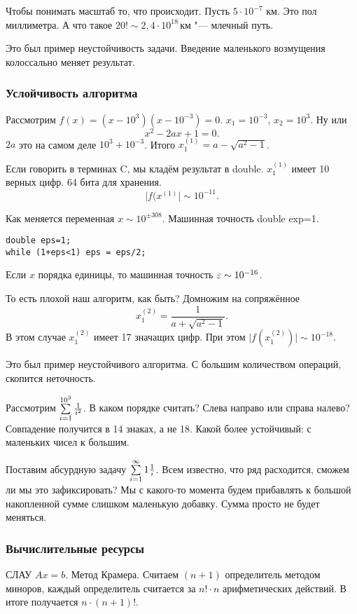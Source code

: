 Чтобы понимать масштаб то, что происходит. Пусть $5\cdot10^{-7}$ км. Это пол миллиметра. А что такое $20!\sim 2{,}4\cdot 10^{18}\,$км "--- млечный путь.

Это был пример неустойчивость задачи. Введение маленького возмущения колоссально меняет результат.

\subsubsection{Услойчивость алгоритма}
 Рассмотрим $f(x) = (x-10^3)(x-10^{-3})=0$. $x_1 = 10^{-3}$, $x_2 = 10^{3}$. Ну или
\[
  x^2 - 2a x + 1 = 0.
\]
$2a$ это на самом деле $10^3 + 10^{-3}$.
Итого $x_1^{(1)} = a - \sqrt{a^2 - 1}$.

Если говорить в терминах C, мы кладём результат в double. $x_1^{(1)}$ имеет 10 верных цифр. 64 бита для хранения.
\[
  \big|f(x^{(1)}\big|\sim 10^{-11}.
\]

Как меняется переменная $x\sim 10^{\pm 308}$. Машинная точность double exp=1.
\begin{verbatim}
double eps=1;
while (1+eps<1) eps = eps/2;
\end{verbatim}

Если $x$ порядка единицы, то машинная точность $\varepsilon\sim 10^{-16}$.

То есть плохой наш алгоритм, как быть? Домножим на сопряжённое
\[
  x_1^{(2)} = \frac1{a + \sqrt{a^2-1}}.
\]
В этом случае $x_1^{(2)}$ имеет 17 значащих цифр. При этом $\big|f(x_1^{(2)})\big|\sim 10^{-18}$.

Это был пример неустойчивого алгоритма. С большим количеством операций, скопится неточность.

Рассмотрим $\sum\limits_{i = 1}^{10^3}\frac1{i^2}$. В каком порядке считать? Слева направо или справа налево? Совпадение получится в 14 знаках, а не 18. Какой более устойчивый: с маленьких чисел к большим.

Поставим абсурдную задачу $\sum\limits_{{i}={1}}^\infty1\frac1i$. Всем известно, что ряд расходится, сможем ли мы это зафиксировать? Мы с какого-то момента будем прибавлять к большой накопленной сумме слишком маленькую добавку. Сумма просто не будет меняться.

\subsubsection{Вычислительные ресурсы}

СЛАУ $Ax = b$. Метод Крамера. Считаем $(n+1)$ определитель методом миноров, каждый определитель считается за $n!\cdot n$ арифметических действий. В итоге получается $n\cdot(n+1)!$.

